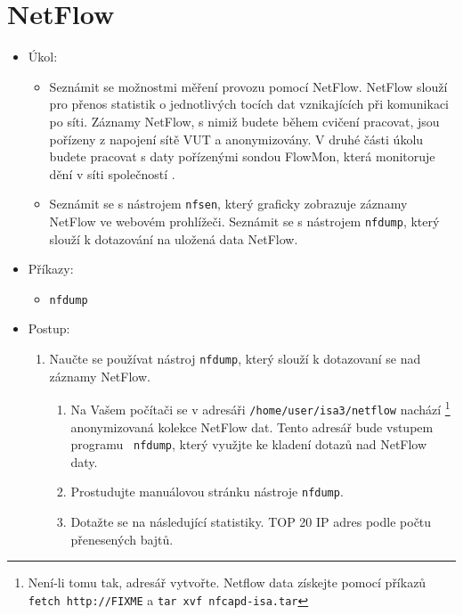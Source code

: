 \section{NetFlow}
  \begin{itemize}
    \item Úkol:
        \begin{itemize}
            \item Seznámit se možnostmi měření provozu pomocí NetFlow. NetFlow slouží pro
            přenos statistik o jednotlivých tocích dat vznikajících při komunikaci po síti.
            Záznamy NetFlow, s nimiž budete během cvičení pracovat, jsou
            pořízeny z napojení sítě VUT a anonymizovány. V druhé části úkolu
            budete pracovat s daty pořízenými sondou FlowMon, která monitoruje
            dění v síti společností .
            \item Seznámit se s nástrojem {\tt nfsen}, který graficky zobrazuje záznamy
            NetFlow ve webovém prohlížeči. Seznámit se s nástrojem {\tt nfdump}, který slouží k dotazování na uložená data NetFlow.
        \end{itemize}
    \item Příkazy:
        \begin{itemize}
            \item {\tt nfdump}
        \end{itemize}
    \item Postup:
        \begin{enumerate}
            \item Naučte se používat nástroj {\tt nfdump}, který slouží k dotazovaní se nad záznamy NetFlow.
                \begin{enumerate}
                    \item Na Vašem počítači se v adresáři {\tt /home/user/isa3/netflow} nachází
               \footnote{Není-li tomu tak, adresář vytvořte. Netflow data
               získejte pomocí příkazů {\tt fetch
               http://FIXME} a {\tt tar xvf
               nfcapd-isa.tar}}
               anonymizovaná kolekce NetFlow dat. Tento adresář bude vstupem programu {\tt
               nfdump}, který využjte ke kladení dotazů nad NetFlow daty.
                    \item Prostudujte manuálovou stránku nástroje {\tt nfdump}.
                    \item Dotažte se na následující statistiky. TOP 20 IP adres podle počtu přenesených bajtů. 
                        \begin{itemize}

\end{itemize}
\end{enumerate}
\end{enumerate}
\end{itemize}
